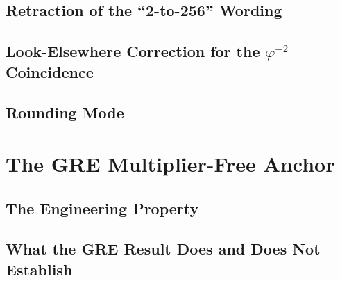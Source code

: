 \documentclass[conference]{IEEEtran}
\begin{document}

\subsection{Retraction of the ``2-to-256'' Wording}

\subsection{Look-Elsewhere Correction for the $\varphi^{-2}$ Coincidence}

\subsection{Rounding Mode}

\section{The GRE Multiplier-Free Anchor}
\label{sec:gre}


\subsection{The Engineering Property}

\subsection{What the GRE Result Does and Does Not Establish}
\end{document}
